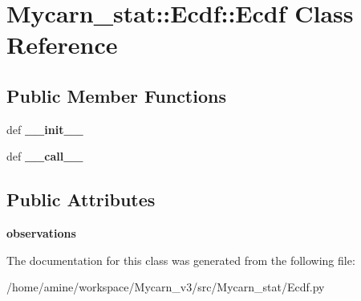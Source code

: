 \hypertarget{classMycarn__stat_1_1Ecdf_1_1Ecdf}{
\section{\-Mycarn\-\_\-stat\-:\-:\-Ecdf\-:\-:\-Ecdf \-Class \-Reference}
\label{classMycarn__stat_1_1Ecdf_1_1Ecdf}
}
\subsection*{\-Public \-Member \-Functions}
\begin{DoxyCompactItemize}
\item 
\hypertarget{classMycarn__stat_1_1Ecdf_1_1Ecdf_aec42b4c229005457b4ef4ddaf05597f5}{
def {\bfseries \-\_\-\-\_\-init\-\_\-\-\_\-}}
\label{classMycarn__stat_1_1Ecdf_1_1Ecdf_aec42b4c229005457b4ef4ddaf05597f5}

\item 
\hypertarget{classMycarn__stat_1_1Ecdf_1_1Ecdf_a2476b354c6671c2db5b23a272a03ee8d}{
def {\bfseries \-\_\-\-\_\-call\-\_\-\-\_\-}}
\label{classMycarn__stat_1_1Ecdf_1_1Ecdf_a2476b354c6671c2db5b23a272a03ee8d}

\end{DoxyCompactItemize}
\subsection*{\-Public \-Attributes}
\begin{DoxyCompactItemize}
\item 
\hypertarget{classMycarn__stat_1_1Ecdf_1_1Ecdf_ad0198fdee7bcc764e6253141e32179f0}{
{\bfseries observations}}
\label{classMycarn__stat_1_1Ecdf_1_1Ecdf_ad0198fdee7bcc764e6253141e32179f0}

\end{DoxyCompactItemize}


\-The documentation for this class was generated from the following file\-:\begin{DoxyCompactItemize}
\item 
/home/amine/workspace/\-Mycarn\-\_\-v3/src/\-Mycarn\-\_\-stat/\-Ecdf.\-py\end{DoxyCompactItemize}
